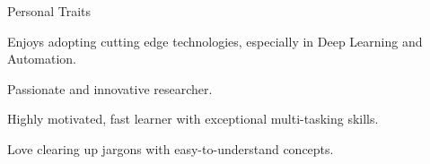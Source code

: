
\begin{rSection}{Personal Traits}
    \begin{rSubsection}{}{}{}{}
        \item Enjoys adopting cutting edge technologies, especially in Deep Learning and Automation.
        \item Passionate and innovative researcher.
        \item Highly motivated, fast learner with exceptional multi-tasking skills.
        \item Love clearing up jargons with easy-to-understand concepts.
    \end{rSubsection}
\end{rSection}